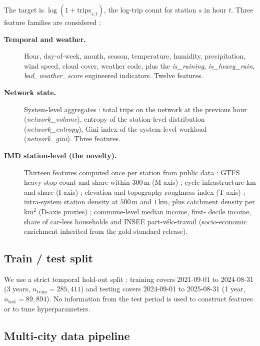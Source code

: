 \documentclass[11pt,a4paper]{article}
\begin{document}
The target is $\log(1 + \text{trips}_{s,t})$, the log-trip count
for station $s$ in hour $t$.  Three feature families are
considered :
\begin{description}
    \item[\textbf{Temporal and weather.}]  Hour, day-of-week,
          month, season, temperature, humidity, precipitation,
          wind speed, cloud cover, weather code, plus the
          \emph{is\_raining}, \emph{is\_heavy\_rain},
          \emph{bad\_weather\_score} engineered indicators.
          Twelve features.

    \item[\textbf{Network state.}]  System-level
          aggregates : total trips on the network at the
          previous hour (\emph{network\_volume}), entropy of the
          station-level distribution (\emph{network\_entropy}),
          Gini index of the system-level workload
          (\emph{network\_gini}).  Three features.

    \item[\textbf{IMD station-level (the novelty).}]  Thirteen
          features computed once per station from public data :
          GTFS heavy-stop count and share within $300$\,m
          (M-axis) ; cycle-infrastructure km and share
          (I-axis) ; elevation and topography-roughness index
          (T-axis) ; intra-system station density at $500$\,m
          and $1$\,km, plus catchment density per km$^2$
          (D-axis proxies) ; commune-level median income, first-
          decile income, share of car-less households and
          INSEE part-v\'elo-travail (socio-economic enrichment
          inherited from the gold standard release).
\end{description}

\subsection{Train / test split}

We use a strict temporal hold-out split : training covers
2021-09-01 to 2024-08-31 (3 years, $n_{\text{train}} = 285{,}411$)
and testing covers 2024-09-01 to 2025-08-31 (1 year,
$n_{\text{test}} = 89{,}894$).  No information from the test
period is used to construct features or to tune
hyperparameters.

\subsection{Multi-city data pipeline}
\label{sec:multicity}
\end{document}
